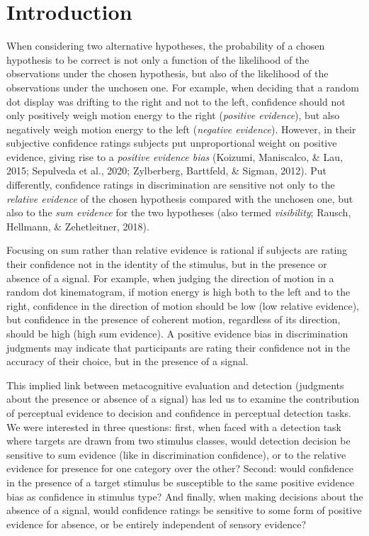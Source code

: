 \documentclass[12pt,twoside]{reedthesis}
\begin{document}
\hypertarget{introduction-4}{%
\section{Introduction}\label{introduction-4}}

When considering two alternative hypotheses, the probability of a chosen hypothesis to be correct is not only a function of the likelihood of the observations under the chosen hypothesis, but also of the likelihood of the observations under the unchosen one. For example, when deciding that a random dot display was drifting to the right and not to the left, confidence should not only positively weigh motion energy to the right (\emph{positive evidence}), but also negatively weigh motion energy to the left (\emph{negative evidence}). However, in their subjective confidence ratings subjects put unproportional weight on positive evidence, giving rise to a \emph{positive evidence bias} (Koizumi, Maniscalco, \& Lau, 2015; Sepulveda et al., 2020; Zylberberg, Barttfeld, \& Sigman, 2012). Put differently, confidence ratings in discrimination are sensitive not only to the \emph{relative evidence} of the chosen hypothesis compared with the unchosen one, but also to the \emph{sum evidence} for the two hypotheses (also termed \emph{visibility}; Rausch, Hellmann, \& Zehetleitner, 2018).

Focusing on sum rather than relative evidence is rational if subjects are rating their confidence not in the identity of the stimulus, but in the presence or absence of a signal. For example, when judging the direction of motion in a random dot kinematogram, if motion energy is high both to the left and to the right, confidence in the direction of motion should be low (low relative evidence), but confidence in the presence of coherent motion, regardless of its direction, should be high (high sum evidence). A positive evidence bias in discrimination judgments may indicate that participants are rating their confidence not in the accuracy of their choice, but in the presence of a signal.

This implied link between metacognitive evaluation and detection (judgments about the presence or absence of a signal) has led us to examine the contribution of perceptual evidence to decision and confidence in perceptual detection tasks. We were interested in three questions: first, when faced with a detection task where targets are drawn from two stimulus classes, would detection decision be sensitive to sum evidence (like in discrimination confidence), or to the relative evidence for presence for one category over the other? Second: would confidence in the presence of a target stimulus be susceptible to the same positive evidence bias as confidence in stimulus type? And finally, when making decisions about the absence of a signal, would confidence ratings be sensitive to some form of positive evidence for absence, or be entirely independent of sensory evidence?
\end{document}
